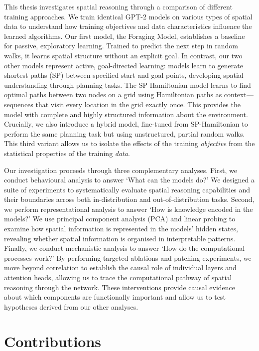 This thesis investigates spatial reasoning through a comparison of different training approaches. We train identical GPT-2 \citep{radford2019language} models on various types of spatial data to understand how training objectives and data characteristics influence the learned algorithms. Our first model, the Foraging Model, establishes a baseline for passive, exploratory learning. Trained to predict the next step in random walks, it learns spatial structure without an explicit goal. In contrast, our two other models represent active, goal-directed learning: models learn to generate shortest paths (SP) between specified start and goal points, developing spatial understanding through planning tasks. The SP-Hamiltonian model learns to find optimal paths between two nodes on a grid using Hamiltonian paths as context—sequences that visit every location in the grid exactly once. This provides the model with complete and highly structured information about the environment. Crucially, we also introduce a hybrid model, fine-tuned from SP-Hamiltonian to perform the same planning task but using unstructured, partial random walks. This third variant allows us to isolate the effects of the training \textit{objective} from the statistical properties of the training \textit{data}. 

Our investigation proceeds through three complementary analyses. First, we conduct behavioural analysis to answer `What can the models do?' We designed a suite of experiments to systematically evaluate spatial reasoning capabilities and their boundaries across both in-distribution and out-of-distribution tasks. Second, we perform representational analysis to answer `How is knowledge encoded in the models?' We use principal component analysis (PCA) and linear probing to examine how spatial information is represented in the models' hidden states, revealing whether spatial information is organised in interpretable patterns. Finally, we conduct mechanistic analysis to answer `How do the computational processes work?' By performing targeted ablations and patching experiments, we move beyond correlation to establish the causal role of individual layers and attention heads, allowing us to trace the computational pathway of spatial reasoning through the network. These interventions provide causal evidence about which components are functionally important and allow us to test hypotheses derived from our other analyses.


\section{Contributions}


